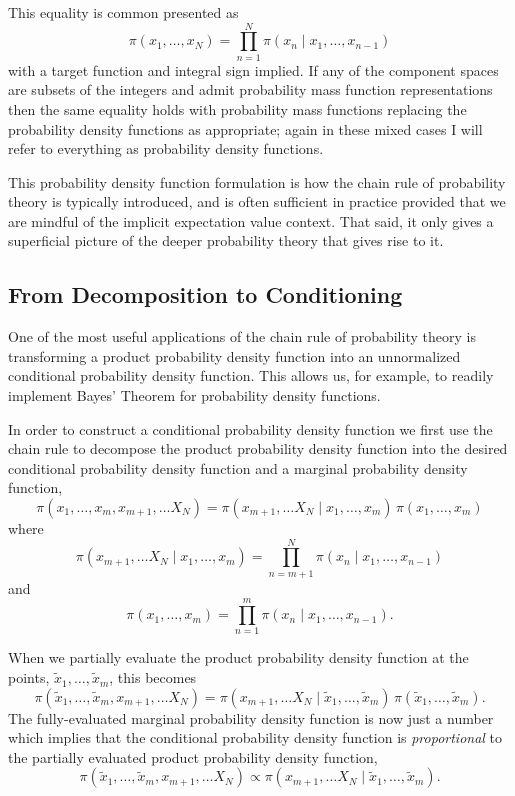 \documentclass[]{article}
\begin{document}
This equality is common presented as \[
\pi(x_{1}, \ldots, x_{N}) = \prod_{n = 1}^{N} \pi(x_{n} \mid x_{1}, \ldots, x_{n - 1})
\] with a target function and integral sign implied. If any of the
component spaces are subsets of the integers and admit probability mass
function representations then the same equality holds with probability
mass functions replacing the probability density functions as
appropriate; again in these mixed cases I will refer to everything as
probability density functions.

This probability density function formulation is how the chain rule of
probability theory is typically introduced, and is often sufficient in
practice provided that we are mindful of the implicit expectation value
context. That said, it only gives a superficial picture of the deeper
probability theory that gives rise to it.

\hypertarget{from-decomposition-to-conditioning}{%
\subsection{From Decomposition to
Conditioning}\label{from-decomposition-to-conditioning}}

One of the most useful applications of the chain rule of probability
theory is transforming a product probability density function into an
unnormalized conditional probability density function. This allows us,
for example, to readily implement Bayes' Theorem for probability density
functions.

In order to construct a conditional probability density function we
first use the chain rule to decompose the product probability density
function into the desired conditional probability density function and a
marginal probability density function, \[
\pi(x_{1}, \ldots, x_{m}, x_{m + 1}, \ldots X_{N})
=
\pi(x_{m + 1}, \ldots X_{N} \mid x_{1}, \ldots, x_{m}) \,
\pi(x_{1}, \ldots, x_{m})
\] where \[
\pi(x_{m + 1}, \ldots X_{N} \mid x_{1}, \ldots, x_{m})
=
\prod_{n = m + 1}^{N} \pi(x_{n} \mid x_{1}, \ldots, x_{n - 1})
\] and \[
\pi(x_{1}, \ldots, x_{m})
=
\prod_{n = 1}^{m} \pi(x_{n} \mid x_{1}, \ldots, x_{n - 1}).
\]

When we partially evaluate the product probability density function at
the points, \(\tilde{x}_{1}, \ldots, \tilde{x}_{m}\), this becomes \[
\pi(\tilde{x}_{1}, \ldots, \tilde{x}_{m}, x_{m + 1}, \ldots X_{N})
=
\pi(x_{m + 1}, \ldots X_{N} \mid \tilde{x}_{1}, \ldots, \tilde{x}_{m}) \,
\pi(\tilde{x}_{1}, \ldots, \tilde{x}_{m}).
\] The fully-evaluated marginal probability density function is now just
a number which implies that the conditional probability density function
is \emph{proportional} to the partially evaluated product probability
density function, \[
\pi(\tilde{x}_{1}, \ldots, \tilde{x}_{m}, x_{m + 1}, \ldots X_{N})
\propto
\pi(x_{m + 1}, \ldots X_{N} \mid \tilde{x}_{1}, \ldots, \tilde{x}_{m}).
\]
\end{document}
